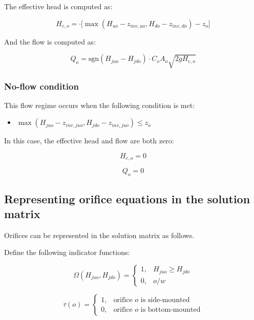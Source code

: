 \documentclass[11pt]{article}
\begin{document}
The effective head is computed as:

\begin{equation}
  H_{e,o} = \cdot \bigl[ \max(H_{uo} - z_{inv,uo}, H_{do} - z_{inv,do}) - z_o \bigr]
\end{equation}

And the flow is computed as:

\begin{equation}
 Q_o = \text{sgn}(H_{juo} - H_{jdo}) \cdot C_o A_o \sqrt{2 g H_{e,o}} 
\end{equation}

\subsubsection*{No-flow condition}

This flow regime occurs when the following condition is met:

\begin{itemize}
\item $\max(H_{juo} - z_{inv,juo}, H_{jdo} - z_{inv,juo}) \leq z_o$
\end{itemize}

In this case, the effective head and flow are both zero:

\begin{equation}
  H_{e,o} = 0
\end{equation}

\begin{equation}
  Q_{o} = 0
\end{equation}

\subsection{Representing orifice equations in the solution matrix}

Orifices can be represented in the solution matrix as follows.

Define the following indicator functions:

\begin{equation}
  \Omega(H_{juo}, H_{jdo}) = 
  \begin{cases}
    1, & H_{juo} \geq H_{jdo} \\
    0, & o/w
  \end{cases}
\end{equation}

\begin{equation}
  \tau(o) = 
  \begin{cases}
    1, & \text{orifice $o$ is side-mounted} \\
    0, & \text{orifice $o$ is bottom-mounted}
  \end{cases}
\end{equation}
\end{document}
